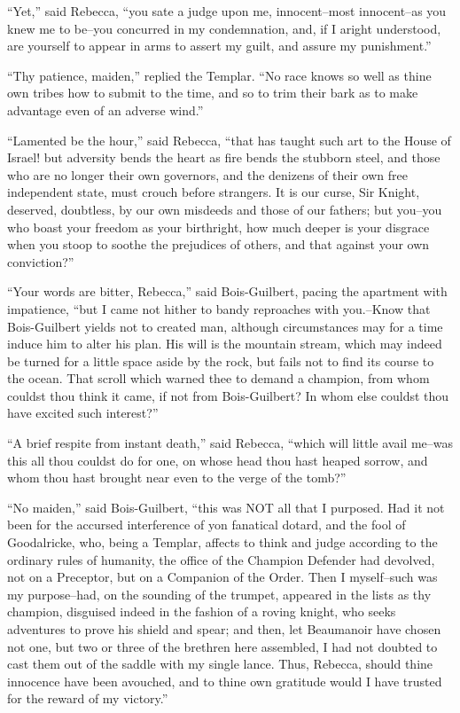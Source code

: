 ``Yet,'' said Rebecca, ``you sate a judge upon me, innocent--most
innocent--as you knew me to be--you concurred in my condemnation, and,
if I aright understood, are yourself to appear in arms to assert my
guilt, and assure my punishment.''

``Thy patience, maiden,'' replied the Templar. ``No race knows so well
as thine own tribes how to submit to the time, and so to trim their bark
as to make advantage even of an adverse wind.''

``Lamented be the hour,'' said Rebecca, ``that has taught such art to
the House of Israel! but adversity bends the heart as fire bends the
stubborn steel, and those who are no longer their own governors, and the
denizens of their own free independent state, must crouch before
strangers. It is our curse, Sir Knight, deserved, doubtless, by our own
misdeeds and those of our fathers; but you--you who boast your freedom
as your birthright, how much deeper is your disgrace when you stoop to
soothe the prejudices of others, and that against your own conviction?''

``Your words are bitter, Rebecca,'' said Bois-Guilbert, pacing the
apartment with impatience, ``but I came not hither to bandy reproaches
with you.--Know that Bois-Guilbert yields not to created man, although
circumstances may for a time induce him to alter his plan. His will is
the mountain stream, which may indeed be turned for a little space aside
by the rock, but fails not to find its course to the ocean. That scroll
which warned thee to demand a champion, from whom couldst thou think it
came, if not from Bois-Guilbert? In whom else couldst thou have excited
such interest?''

``A brief respite from instant death,'' said Rebecca, ``which will
little avail me--was this all thou couldst do for one, on whose head
thou hast heaped sorrow, and whom thou hast brought near even to the
verge of the tomb?''

``No maiden,'' said Bois-Guilbert, ``this was NOT all that I purposed.
Had it not been for the accursed interference of yon fanatical dotard,
and the fool of Goodalricke, who, being a Templar, affects to think and
judge according to the ordinary rules of humanity, the office of the
Champion Defender had devolved, not on a Preceptor, but on a Companion
of the Order. Then I myself--such was my purpose--had, on the sounding
of the trumpet, appeared in the lists as thy champion, disguised indeed
in the fashion of a roving knight, who seeks adventures to prove his
shield and spear; and then, let Beaumanoir have chosen not one, but two
or three of the brethren here assembled, I had not doubted to cast them
out of the saddle with my single lance. Thus, Rebecca, should thine
innocence have been avouched, and to thine own gratitude would I have
trusted for the reward of my victory.''

